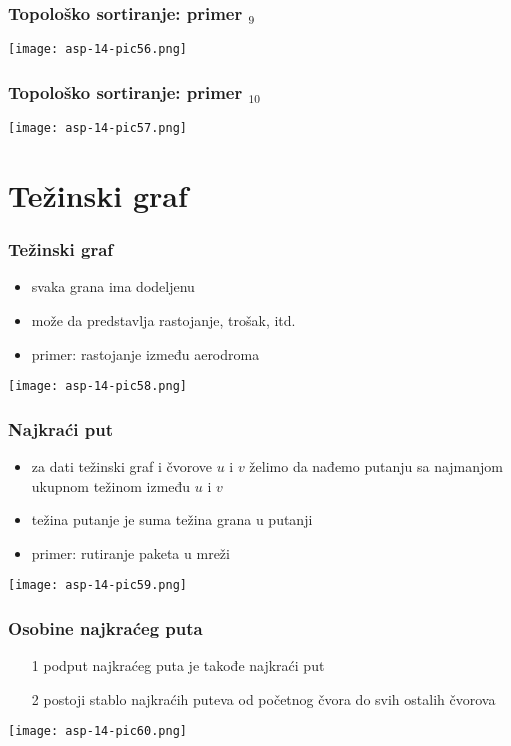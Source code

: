 \documentclass[compress,aspectratio=169]{beamer}
\begin{document}
\begin{frame}[fragile]
  \frametitle{Topološko sortiranje: primer $_9$}
  \begin{center}
    \texttt{[image: asp-14-pic56.png]}
  \end{center}
\end{frame}

\begin{frame}[fragile]
  \frametitle{Topološko sortiranje: primer $_{10}$}
  \begin{center}
    \texttt{[image: asp-14-pic57.png]}
  \end{center}
\end{frame}

\section[Težinski graf]{Težinski graf}

\begin{frame}[fragile]
  \frametitle{Težinski graf}
  \begin{itemize}
    \item svaka grana ima dodeljenu 
    \item može da predstavlja rastojanje, trošak, itd.
    \item primer: rastojanje između aerodroma
  \end{itemize}
  \begin{center}
    \texttt{[image: asp-14-pic58.png]}
  \end{center}
\end{frame}

\begin{frame}[fragile]
  \frametitle{Najkraći put}
  \begin{itemize}
    \item za dati težinski graf i čvorove $u$ i $v$ želimo da nađemo
      putanju sa najmanjom ukupnom težinom između $u$ i $v$
    \item težina putanje je suma težina grana u putanji
    \item primer: rutiranje paketa u mreži
  \end{itemize}
  \begin{center}
    \texttt{[image: asp-14-pic59.png]}
  \end{center}
\end{frame}

\begin{frame}[fragile]
  \frametitle{Osobine najkraćeg puta}
  \begin{itemize}
    \item[1] podput najkraćeg puta je takođe najkraći put
    \item[2] postoji stablo najkraćih puteva od početnog čvora do svih
      ostalih čvorova
  \end{itemize}
  \begin{center}
    \texttt{[image: asp-14-pic60.png]}
  \end{center}
\end{frame}
\end{document}
